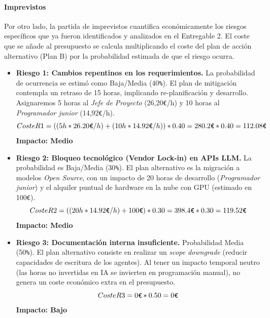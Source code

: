 \documentclass[11pt, letterpaper]{article}
\begin{document}
\paragraph{Imprevistos}
\label{sec:imprevistos_sub}
Por otro lado, la partida de imprevistos cuantifica económicamente los riesgos específicos que ya fueron identificados y analizados en el Entregable 2. El coste que se añade al presupuesto se calcula multiplicando el coste del plan de acción alternativo (Plan B) por la probabilidad estimada de que el riesgo ocurra.

\begin{itemize} 
    \item \textbf{Riesgo 1: Cambios repentinos en los requerimientos.} La  probabilidad de ocurrencia se estimó como Baja/Media (40\verb|%|). El plan de mitigación contempla un retraso de 15 horas, implicando re-planificación y desarrollo. Asignaremos 5 horas al \textit{Jefe de Proyecto} (26,20\verb|€|/h) y 10 horas al \textit{Programador junior} (14,92\verb|€|/h).
    \begin{equation*}
        Coste R1 = ((5h * 26{.}20\verb|€|/h) + (10h * 14{.}92\verb|€|/h)) * 0{.}40 = 280{.}2\verb|€| * 0{.}40 = 112{.}08\verb|€|
    \end{equation*}
    \textbf{Impacto: Medio}

    \item \textbf{Riesgo 2: Bloqueo tecnológico (Vendor Lock-in) en APIs LLM.} La probabilidad es Baja/Media (30\verb|%|). El plan alternativo es la migración a modelos \textit{Open Source}, con un impacto de 20 horas de desarrollo (\textit{Programador junior}) y el alquiler puntual de hardware en la nube con GPU (estimado en 100\verb|€|).
    \begin{equation*}
        Coste R2 = ((20h * 14{.}92\verb|€|/h) + 100\verb|€|) * 0{.}30 = 398{.}4\verb|€| * 0{.}30 = 119{.}52\verb|€|
    \end{equation*}
    \textbf{Impacto: Medio}

    \item \textbf{Riesgo 3: Documentación interna insuficiente.} Probabilidad Media (50\verb|%|). El plan alternativo consiste en realizar un \textit{scope downgrade} (reducir capacidades de escritura de los agentes). Al tener un impacto temporal neutro (las horas no invertidas en IA se invierten en programación manual), no genera un coste económico extra en el presupuesto.
    \begin{equation*}
        Coste R3 = 0\verb|€| * 0{.}50 = 0\verb|€|
    \end{equation*}
    \textbf{Impacto: Bajo}


\end{itemize}
\end{document}
